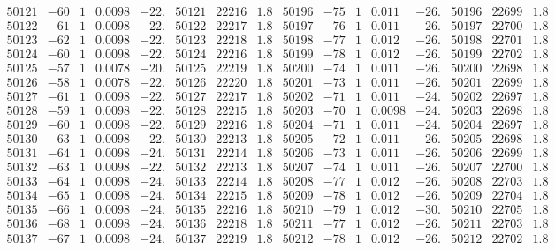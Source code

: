 \documentclass[11pt,reqno,a4letter]{article}
\numberwithin{figure}{section}
\numberwithin{table}{section}
\theoremstyle{plain}
\numberwithin{theorem}{section}
\theoremstyle{definition}
\begin{document}
\begin{table}[ht]
\begin{equation*}
{\begin{array}{ccccc|ccc||ccccc|ccc}
50121 & -60 & 1 & 0.0098 & -22. & 50121 & 22216 & 1.8 & 50196 & -75 & 1 & 0.011 & -26. & 50196 & 22699 & 1.8  \\
50122 & -61 & 1 & 0.0098 & -22. & 50122 & 22217 & 1.8 & 50197 & -76 & 1 & 0.011 & -26. & 50197 & 22700 & 1.8  \\
50123 & -62 & 1 & 0.0098 & -22. & 50123 & 22218 & 1.8 & 50198 & -77 & 1 & 0.012 & -26. & 50198 & 22701 & 1.8  \\
50124 & -60 & 1 & 0.0098 & -22. & 50124 & 22216 & 1.8 & 50199 & -78 & 1 & 0.012 & -26. & 50199 & 22702 & 1.8  \\
50125 & -57 & 1 & 0.0078 & -20. & 50125 & 22219 & 1.8 & 50200 & -74 & 1 & 0.011 & -26. & 50200 & 22698 & 1.8  \\
50126 & -58 & 1 & 0.0078 & -22. & 50126 & 22220 & 1.8 & 50201 & -73 & 1 & 0.011 & -26. & 50201 & 22699 & 1.8  \\
50127 & -61 & 1 & 0.0098 & -22. & 50127 & 22217 & 1.8 & 50202 & -71 & 1 & 0.011 & -24. & 50202 & 22697 & 1.8  \\
50128 & -59 & 1 & 0.0098 & -22. & 50128 & 22215 & 1.8 & 50203 & -70 & 1 & 0.0098 & -24. & 50203 & 22698 & 1.8  \\
50129 & -60 & 1 & 0.0098 & -22. & 50129 & 22216 & 1.8 & 50204 & -71 & 1 & 0.011 & -24. & 50204 & 22697 & 1.8  \\
50130 & -63 & 1 & 0.0098 & -22. & 50130 & 22213 & 1.8 & 50205 & -72 & 1 & 0.011 & -26. & 50205 & 22698 & 1.8  \\
50131 & -64 & 1 & 0.0098 & -24. & 50131 & 22214 & 1.8 & 50206 & -73 & 1 & 0.011 & -26. & 50206 & 22699 & 1.8  \\
50132 & -63 & 1 & 0.0098 & -22. & 50132 & 22213 & 1.8 & 50207 & -74 & 1 & 0.011 & -26. & 50207 & 22700 & 1.8  \\
50133 & -64 & 1 & 0.0098 & -24. & 50133 & 22214 & 1.8 & 50208 & -77 & 1 & 0.012 & -26. & 50208 & 22703 & 1.8  \\
50134 & -65 & 1 & 0.0098 & -24. & 50134 & 22215 & 1.8 & 50209 & -78 & 1 & 0.012 & -26. & 50209 & 22704 & 1.8  \\
50135 & -66 & 1 & 0.0098 & -24. & 50135 & 22216 & 1.8 & 50210 & -79 & 1 & 0.012 & -30. & 50210 & 22705 & 1.8  \\
50136 & -68 & 1 & 0.0098 & -24. & 50136 & 22218 & 1.8 & 50211 & -77 & 1 & 0.012 & -26. & 50211 & 22703 & 1.8  \\
50137 & -67 & 1 & 0.0098 & -24. & 50137 & 22219 & 1.8 & 50212 & -78 & 1 & 0.012 & -26. & 50212 & 22702 & 1.8  \\

\end{array}}
\end{equation*}
\end{table}
\end{document}
